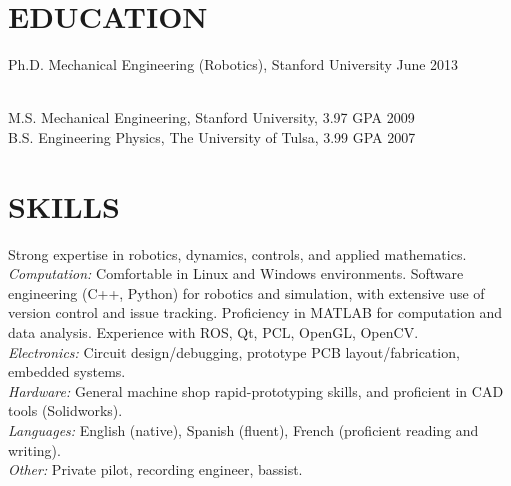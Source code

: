 \documentclass[line,margin]{res}
\newcommand{\CVOnly}[1]{}
\newcommand{\CVOnly}[1]{#1}
\begin{document}
\address{PO Box 17501, Stanford, CA 94309}
\address{650.762.6844}
\address{adamleeper@gmail.com} 
\address{www.adamleeper.com}

 
\begin{resume}
 

\section{EDUCATION}
\vspace{1.0pc}
Ph.D. Mechanical Engineering (Robotics), Stanford University 
\hfill June 2013%
\CVOnly{ {\small
\\[0.0pc]Advisor: Prof. Kenneth Salisbury
\\[0.0pc]Thesis: Robot Telemanipulation in Unstructured Environments: Sensors, Algorithms, Interfaces.
\\[-0.6pc]} }
%
\\[0.0pc]M.S. Mechanical Engineering, Stanford University, 3.97 GPA \hfill  2009 
\\[0.0pc] B.S. Engineering Physics, The University of Tulsa, 3.99 GPA \hfill 2007 
%
%
\section{SKILLS}
\vspace{1.0pc}Strong expertise in robotics, dynamics, controls, and applied mathematics.
\\[0.25pc] {\sl Computation: }
Comfortable in Linux and Windows environments.
Software engineering (C++, Python) for robotics and simulation, with extensive use of version control and issue tracking. 
Proficiency in MATLAB for computation and data analysis.
Experience with ROS, Qt, PCL, OpenGL, OpenCV. 
\\[0.25pc]{\sl Electronics: } Circuit design/debugging, prototype PCB layout/fabrication, embedded systems.  
\\[0.25pc]{\sl Hardware: } General machine shop rapid-prototyping skills, and proficient in CAD tools (Solidworks). 
\\[0.25pc]{\sl Languages: } English (native), Spanish (fluent), French (proficient reading and writing). 
\\[0.25 		pc]{\sl Other: } Private pilot, recording engineer, bassist.    
%
%

\end{resume}
\end{document}
